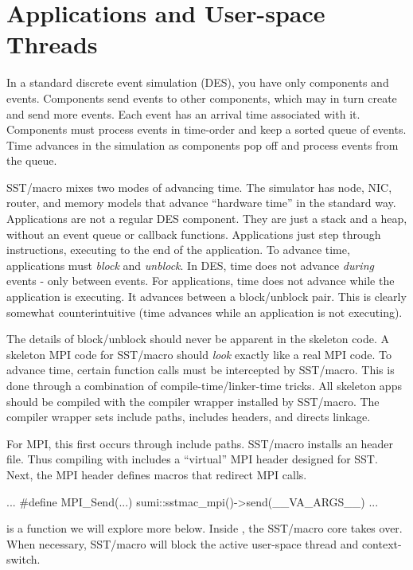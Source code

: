 \section{Applications and User-space Threads}
\label{sec:appThreads}

In a standard discrete event simulation (DES), you have only components and events.
Components send events to other components, which may in turn create and send more events.
Each event has an arrival time associated with it.
Components must process events in time-order and keep a sorted queue of events.
Time advances in the simulation as components pop off and process events from the queue.

SST/macro mixes two modes of advancing time.
The simulator has node, NIC, router, and memory models that advance ``hardware time'' in the standard way.
Applications are not a regular DES component.
They are just a stack and a heap, without an event queue or  callback functions.
Applications just step through instructions, executing to the end of the application.
To advance time, applications must \emph{block} and \emph{unblock}.
In DES, time does not advance \emph{during} events - only between events.
For applications, time does not advance while the application is executing.
It advances between a block/unblock pair.
This is clearly somewhat counterintuitive (time advances while an application is not executing).

The details of block/unblock should never be apparent in the skeleton code.
A skeleton MPI code for SST/macro should \emph{look} exactly like a real MPI code.
To advance time, certain function calls must be intercepted by SST/macro.
This is done through a combination of compile-time/linker-time tricks.
All skeleton apps should be compiled with the  compiler wrapper installed by SST/macro.
The compiler wrapper sets include paths, includes headers, and directs linkage.

For MPI, this first occurs through include paths. SST/macro installs an  header file.
Thus compiling with  includes a ``virtual'' MPI header designed for SST.
Next, the MPI header defines macros that redirect MPI calls.

\begin{CppCode}
...
#define MPI_Send(...) sumi::sstmac_mpi()->send(__VA_ARGS__)
...
\end{CppCode}
 is a function we will explore more below.
Inside , the SST/macro core takes over.
When necessary, SST/macro will block the active user-space thread and context-switch.

